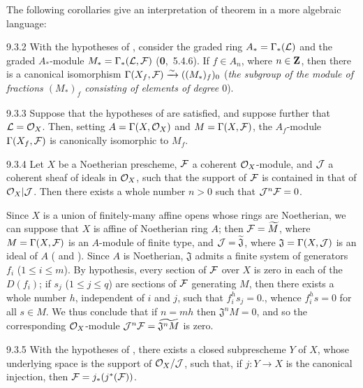 \documentclass[../main.tex]{subfiles}
\begin{document}
The following corollaries give an interpretation of theorem  in a more algebraic
language:

\begin{env}[Corollary]{9.3.2}
With the hypotheses of , consider the graded ring $A_\ast=\Gamma_\ast(\mathcal{L})$
and the graded $A_\ast$-module $M_\ast=\Gamma_\ast(\mathcal{L},\mathcal{F})$
{\normalfont(\textbf{0},~5.4.6)}. If $f\in A_n$, where $n\in\mathbf{Z}$, then there is
a canonical isomorphism $\Gamma(X_f,\mathcal{F})\xrightarrow{\sim}((M_\ast)_f)_0$
(\emph{the subgroup of the module of fractions $(M_\ast)_f$ consisting of elements of degree
$0$}).
\end{env}

\begin{env}[Corollary]{9.3.3}
Suppose that the hypotheses of  are satisfied, and suppose further that
$\mathcal{L}=\mathcal{O}_X$. Then, setting $A=\Gamma(X,\mathcal{O}_X)$ and $M=\Gamma(X,\mathcal{F})$,
the $A_f$-module $\Gamma(X_f,\mathcal{F})$ is canonically isomorphic to $M_f$.
\end{env}

\begin{env}[Proposition]{9.3.4}
Let $X$ be a Noetherian prescheme, $\mathcal{F}$ a coherent $\mathcal{O}_X$-module, and $\mathcal{J}$ a
coherent sheaf of ideals in $\mathcal{O}_X$, such that the support of $\mathcal{F}$ is contained in that
of $\mathcal{O}_X|\mathcal{J}$. Then there exists a whole number $n>0$ such that $\mathcal{J}^n\mathcal{F}=0$.
\end{env}

Since $X$ is a union of finitely-many affine opens whose rings are Noetherian, we can suppose
that $X$ is affine of Noetherian ring $A$; then $\mathcal{F}=\widetilde{M}$, where
$M=\Gamma(X,\mathcal{F})$ is an $A$-module of finite type, and $\mathcal{J}=\widetilde{\mathfrak{J}}$,
where $\mathfrak{J}=\Gamma(X,\mathcal{J})$ is an ideal of $A$ ( and ).
Since $A$ is Noetherian, $\mathfrak{J}$ admits a finite system of generators $f_i$ ($1\leq i\leq m$).
By hypothesis, every section of $\mathcal{F}$ over $X$ is zero in each of the $D(f_i)$; if $s_j$
($1\leq j\leq q$) are sections of $\mathcal{F}$ generating $M$, then there exists a whole number
$h$, independent of $i$ and $j$, such that $f_i^h s_j=0$., whence $f_i^h s=0$ for all
$s\in M$. We thus conclude that if $n=mh$ then $\mathfrak{J}^n M=0$, and so the corresponding
$\mathcal{O}_X$-module $\mathcal{J}^n\mathcal{F}=\widetilde{\mathfrak{J}^n M}$  is zero.

\begin{env}[Corollary]{9.3.5}
With the hypotheses of , there exists a closed subprescheme $Y$ of $X$, whose
underlying space is the support of $\mathcal{O}_X/\mathcal{J}$, such that, if $j\colon Y\to X$ is the canonical
injection, then $\mathcal{F}=j_\ast(j^\ast(\mathcal{F}))$.
\end{env}
\end{document}

